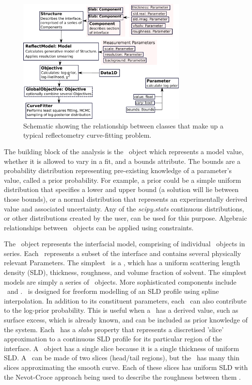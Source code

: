 \documentclass[pdf,preprint]{iucr}
\begin{document}
\begin{figure}
  \includegraphics[width=85mm]{components}
  \caption{Schematic showing the relationship between classes that make up a typical reflectometry curve-fitting problem.}
  \label{fig:components}
\end{figure}

The building block of the analysis is the \Parameter\ object which represents a model value, whether it is allowed to vary in a fit, and a bounds attribute. The bounds are a probability distribution representing pre-existing knowledge of a parameter's value, called a prior probability.
For example, a prior could be a simple uniform distribution that specifies a lower and upper bound (a solution will lie between those bounds), or a normal distribution that represents an experimentally derived value and associated uncertainty.
Any of the \emph{scipy.stats} \cite{Jones2001-2017} continuous distributions, or other distributions created by the user, can be used for this purpose. Algebraic relationships between \Parameter\ objects can be applied using constraints.

The \Structure\ object represents the interfacial model, comprising of individual \Component\ objects in series. Each \Component\ represents a subset of the interface and contains several physically relevant Parameters. The simplest \Component\ is a \Slab, which has a uniform scattering length density (SLD), thickness, roughness, and volume fraction of solvent. The simplest models are simply a series of \Slab\ objects. More sophisticated components include \LipidLeaflet\ and \Spline. \Spline\ is designed for freeform modelling of an SLD profile using spline interpolation. In addition to its constituent parameters, each \Component\ can also contribute to the log-prior probability. This is useful when a \Component\ has a derived value, such as surface excess, which is already known, and can be included as prior knowledge of the system. Each \Component\ has a \emph{slabs} property that represents a discretised 'slice' approximation to a continuous SLD profile for its particular region of the interface. A \Slab\ object has a single slice because it is a single thickness of uniform SLD. A \LipidLeaflet\ can be made of two slices (head/tail regions), but the \Spline\ has many thin slices approximating the smooth curve. Each of these slices has uniform SLD with the Nevot-Croce approach being used to describe the roughness between them \cite{Nevot1980}.
\end{document}
